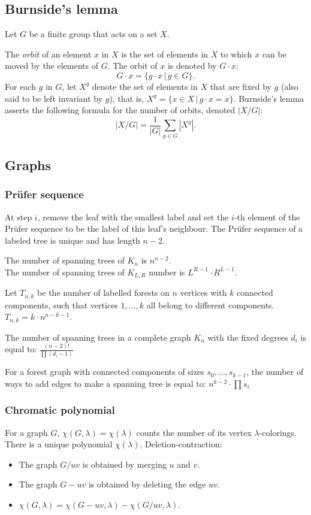 \subsection{Burnside's lemma}

Let $G$ be a finite group that acts on a set $X$.

The \textit{orbit} of an element $x$ in $X$ is the set of elements
in $X$ to which $x$ can be moved by the elements of $G$.
The orbit of $x$ is denoted by $G \cdot x$:
 $$G \cdot x = \{g \cdot x\, |\, g \in G\}.$$
For each $g$ in $G$, let $X^g$ denote the set of elements
in $X$ that are fixed by $g$ (also said to be left invariant by $g$),
that is, $X^g = \{ x \in X\, |\, g \cdot x = x \}$.
Burnside's lemma asserts the following formula for the number of orbits,
denoted $|X/G|$:
$$|X/G| = \frac{1}{|G|} \sum_{g \in G} |X^g|.$$

\subsection{Graphs}

\subsubsection{Prüfer sequence}
At step $i$, remove the leaf with the smallest label and set the $i$-th 
element of the Prüfer sequence to be the label of this leaf's neighbour.
The Prüfer sequence of a labeled tree is unique and has length $n - 2$.

The number of spanning trees of $K_n$ is $n^{n - 2}$.\\
The number of spanning trees of $K_{L, R}$ number is $L^{R - 1} \cdot R^{L - 1}$.

Let $T_{n, k}$ be the number of labelled forests on $n$ vertices with $k$ connected components, 
such that vertices $1, \dots, k$ all belong to different components. 
$T_{n,k} = k \cdot n^{n - k - 1}$.

The number of spanning trees in a complete graph $K_{n}$ with the fixed degrees
$d_{i}$ is equal to:
$ \frac{(n - 2)!}{\prod(d_i - 1)} $

For a forest graph with connected components of sizes $s_0, \dots, s_{k - 1}$, 
the number of ways to add edges to make a spanning tree is equal to:
$ n^{k - 2} \cdot \prod s_i$

\subsubsection{Chromatic polynomial}
For a graph $G$, $\chi(G, \lambda) = \chi(\lambda)$ counts the number of its vertex $\lambda$-colorings.
There is a unique polynomial $\chi(\lambda)$. Deletion-contraction:
\begin{itemize}
\item The graph $G/uv$ is obtained by merging $u$ and $v$.
\item The graph $G - uv$ is obtained by deleting the edge $uv$.
\item $\chi(G, \lambda) = \chi(G - uv, \lambda) - \chi(G/uv, \lambda)$. 
\end{itemize}

